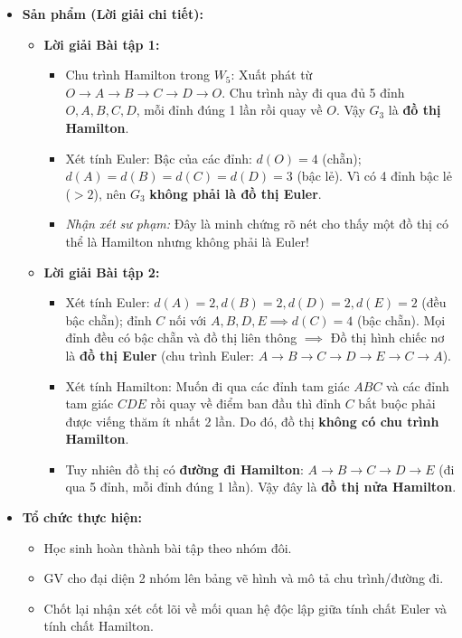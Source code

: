 \documentclass[12pt, a4paper]{article}
\begin{document}
\begin{itemize}[leftmargin=1.2cm]
    \item[c)] \textbf{Sản phẩm (Lời giải chi tiết):}
    \begin{itemize}[leftmargin=0.6cm]
        \item \textbf{Lời giải Bài tập 1:}
        \begin{itemize}
            \item Chu trình Hamilton trong $W_5$: Xuất phát từ $O \to A \to B \to C \to D \to O$. Chu trình này đi qua đủ 5 đỉnh $O, A, B, C, D$, mỗi đỉnh đúng 1 lần rồi quay về $O$. Vậy $G_3$ là \textbf{đồ thị Hamilton}.
            \item Xét tính Euler: Bậc của các đỉnh: $d(O) = 4$ (chẵn); $d(A) = d(B) = d(C) = d(D) = 3$ (bậc lẻ). Vì có 4 đỉnh bậc lẻ ($> 2$), nên $G_3$ \textbf{không phải là đồ thị Euler}.
            \item \textit{Nhận xét sư phạm:} Đây là minh chứng rõ nét cho thấy một đồ thị có thể là Hamilton nhưng không phải là Euler!
        \end{itemize}
        \item \textbf{Lời giải Bài tập 2:}
        \begin{itemize}
            \item Xét tính Euler: $d(A) = 2, d(B) = 2, d(D) = 2, d(E) = 2$ (đều bậc chẵn); đỉnh $C$ nối với $A, B, D, E \implies d(C) = 4$ (bậc chẵn). Mọi đỉnh đều có bậc chẵn và đồ thị liên thông $\implies$ Đồ thị hình chiếc nơ là \textbf{đồ thị Euler} (chu trình Euler: $A \to B \to C \to D \to E \to C \to A$).
            \item Xét tính Hamilton: Muốn đi qua các đỉnh tam giác $ABC$ và các đỉnh tam giác $CDE$ rồi quay về điểm ban đầu thì đỉnh $C$ bắt buộc phải được viếng thăm ít nhất 2 lần. Do đó, đồ thị \textbf{không có chu trình Hamilton}.
            \item Tuy nhiên đồ thị có \textbf{đường đi Hamilton}: $A \to B \to C \to D \to E$ (đi qua 5 đỉnh, mỗi đỉnh đúng 1 lần). Vậy đây là \textbf{đồ thị nửa Hamilton}.
        \end{itemize}
    \end{itemize}

    \item[d)] \textbf{Tổ chức thực hiện:}
    \begin{itemize}[leftmargin=0.6cm]
        \item Học sinh hoàn thành bài tập theo nhóm đôi.
        \item GV cho đại diện 2 nhóm lên bảng vẽ hình và mô tả chu trình/đường đi.
        \item Chốt lại nhận xét cốt lõi về mối quan hệ độc lập giữa tính chất Euler và tính chất Hamilton.
    \end{itemize}
\end{itemize}
\end{document}
